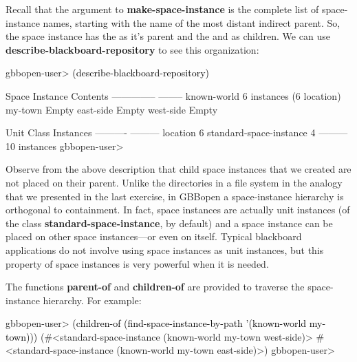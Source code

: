 \documentclass[10pt,twoside,english,pdftex]{article}
\begin{document}
%
Recall that the  argument to
\textbf{make-space-instance} is the complete list of space-instance names,
starting with the name of the most distant indirect parent.  So, the
 space instance has the  as it's parent and
the  and  as children.  We can use
\textbf{describe-blackboard-repository} to see this organization:
%
\W\supp
\begin{example}
\textcolor{darkergray}{%
  gbbopen-user> \textcolor{black}{(describe-blackboard-repository)}

  Space Instance                Contents
  --------------                --------
  known-world                   6 instances (6 location)
     my-town                    Empty
        east-side               Empty
        west-side               Empty

  Unit Class                    Instances
  ----------                    ---------
  location                              6
  standard-space-instance               4
                                ---------
                                       10 instances
  gbbopen-user>}
\end{example}

%
%
Observe from the above description that child space instances that we created
are not placed on their parent.  Unlike the directories in a file system in
the analogy that we presented in the last exercise, in GBBopen a
space-instance hierarchy is orthogonal to containment.  In fact, space
instances are actually unit instances (of the class
\textbf{standard-space-instance}, by default) and a space instance can be
placed on other space instances---or even on itself.  Typical blackboard
applications do not involve using space instances as unit instances, but this
property of space instances is very powerful when it is needed.

%
%
The functions \textbf{parent-of} and \textbf{children-of} are provided to
traverse the space-instance hierarchy.  For example:
%
\W\supp
\begin{example}
\textcolor{darkergray}{%
  gbbopen-user> \textcolor{black}{(children-of 
                  (find-space-instance-by-path '(known-world my-town)))}
  (#<standard-space-instance (known-world my-town west-side)>
   #<standard-space-instance (known-world my-town east-side)>)
  gbbopen-user>}
\end{example}
\end{document}
